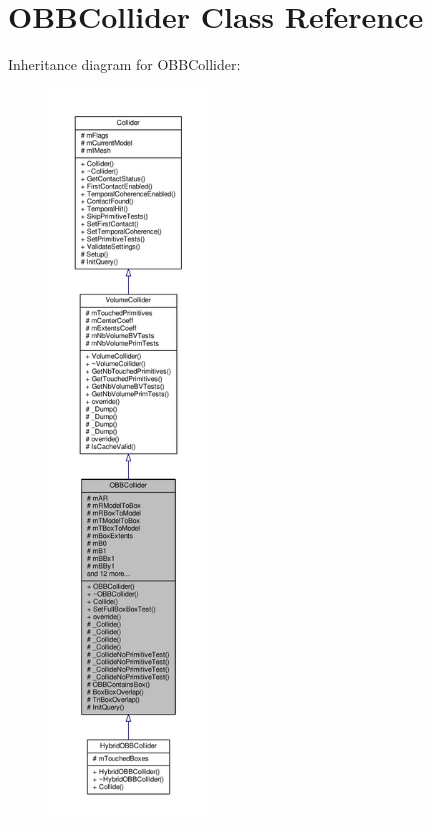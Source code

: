 \hypertarget{classOBBCollider}{}\section{O\+B\+B\+Collider Class Reference}
\label{classOBBCollider}


Inheritance diagram for O\+B\+B\+Collider\+:
\nopagebreak
\begin{figure}[H]
\begin{center}
\leavevmode
\includegraphics[height=550pt]{d7/def/classOBBCollider__inherit__graph}
\end{center}
\end{figure}


